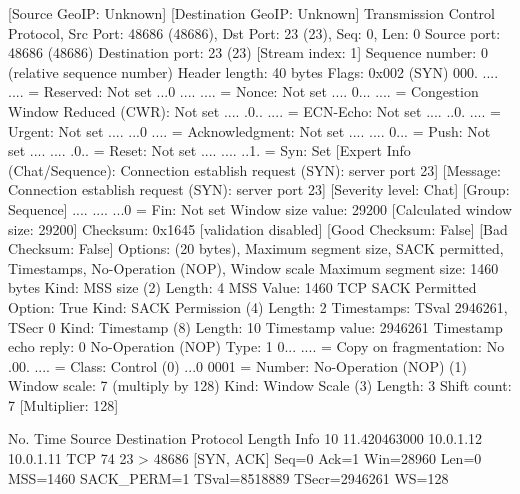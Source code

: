     [Source GeoIP: Unknown]
    [Destination GeoIP: Unknown]
Transmission Control Protocol, Src Port: 48686 (48686), Dst Port: 23 (23), Seq: 0, Len: 0
    Source port: 48686 (48686)
    Destination port: 23 (23)
    [Stream index: 1]
    Sequence number: 0    (relative sequence number)
    Header length: 40 bytes
    Flags: 0x002 (SYN)
        000. .... .... = Reserved: Not set
        ...0 .... .... = Nonce: Not set
        .... 0... .... = Congestion Window Reduced (CWR): Not set
        .... .0.. .... = ECN-Echo: Not set
        .... ..0. .... = Urgent: Not set
        .... ...0 .... = Acknowledgment: Not set
        .... .... 0... = Push: Not set
        .... .... .0.. = Reset: Not set
        .... .... ..1. = Syn: Set
            [Expert Info (Chat/Sequence): Connection establish request (SYN): server port 23]
                [Message: Connection establish request (SYN): server port 23]
                [Severity level: Chat]
                [Group: Sequence]
        .... .... ...0 = Fin: Not set
    Window size value: 29200
    [Calculated window size: 29200]
    Checksum: 0x1645 [validation disabled]
        [Good Checksum: False]
        [Bad Checksum: False]
    Options: (20 bytes), Maximum segment size, SACK permitted, Timestamps, No-Operation (NOP), Window scale
        Maximum segment size: 1460 bytes
            Kind: MSS size (2)
            Length: 4
            MSS Value: 1460
        TCP SACK Permitted Option: True
            Kind: SACK Permission (4)
            Length: 2
        Timestamps: TSval 2946261, TSecr 0
            Kind: Timestamp (8)
            Length: 10
            Timestamp value: 2946261
            Timestamp echo reply: 0
        No-Operation (NOP)
            Type: 1
                0... .... = Copy on fragmentation: No
                .00. .... = Class: Control (0)
                ...0 0001 = Number: No-Operation (NOP) (1)
        Window scale: 7 (multiply by 128)
            Kind: Window Scale (3)
            Length: 3
            Shift count: 7
            [Multiplier: 128]

No.     Time           Source                Destination           Protocol Length Info
     10 11.420463000   10.0.1.12             10.0.1.11             TCP      74     23 > 48686 [SYN, ACK] Seq=0 Ack=1 Win=28960 Len=0 MSS=1460 SACK_PERM=1 TSval=8518889 TSecr=2946261 WS=128

